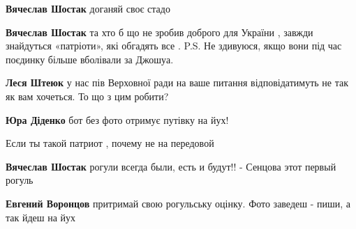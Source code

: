 \begin{itemize}
\begin{itemize}
\textbf{Вячеслав Шостак} доганяй своє стадо

\textbf{Вячеслав Шостак} та хто б що не зробив доброго для України , завжди знайдуться «патріоти», які обгадять все .
P.S. Не здивуюся, якщо вони під час поєдинку більше вболівали за Джошуа.

\textbf{Леся Штеюк} у нас пів Верховної ради на ваше питання відповідатимуть не так як вам хочеться. То що з цим робити?

\textbf{Юра Діденко} бот без фото отримує путівку на йух!

Если ты такой патриот , почему не на передовой

\textbf{Вячеслав Шостак} рогули всегда были, есть и будут!! - Сенцова этот первый рогуль

\textbf{Евгений Воронцов} притримай свою рогульську оцінку.
Фото заведеш - пиши, а так йдеш на йух

\end{itemize} %

\end{itemize} %
